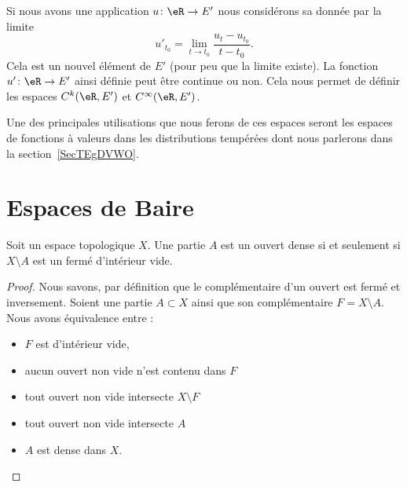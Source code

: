 \begin{definition}  \label{DefDZsypWu}
	Si nous avons une application \( u\colon \eR\to E'\) nous considérons sa  donnée par la limite
	\begin{equation}
		u'_{t_0}=\lim_{t\to t_0} \frac{ u_t-u_{t_0} }{ t-t_0 }.
	\end{equation}
	Cela est un nouvel élément de \( E'\) (pour peu que la limite existe). La fonction \( u'\colon \eR\to E'\) ainsi définie peut être continue ou non. Cela nous permet de définir les espaces \( C^k(\eR,E')\) et \( C^{\infty}(\eR,E')\).
\end{definition}
Une des principales utilisations que nous ferons de ces espaces seront les espaces de fonctions à valeurs dans les distributions tempérées dont nous parlerons dans la section~\ref{SecTEgDVWO}.

\section{Espaces de Baire}

\begin{lemma}	\label{LEMooRTXFooCMCaHC}
	Soit un espace topologique \( X\). Une partie \( A\) est un ouvert dense si et seulement si \( X\setminus A\) est un fermé d'intérieur vide.
\end{lemma}

\begin{proof}
	Nous savons, par définition que le complémentaire d'un ouvert est fermé et inversement. Soient une partie \( A\subset X\) ainsi que son complémentaire \( F=X\setminus A\). Nous avons équivalence entre :
	\begin{itemize}
		\item
		      \( F\) est d'intérieur vide,
		\item
		      aucun ouvert non vide n'est contenu dans \( F\)
		\item
		      tout ouvert non vide intersecte \( X\setminus F\)
		\item
		      tout ouvert non vide intersecte \( A\)
		\item
		      \( A\) est dense dans \( X\).
	\end{itemize}
\end{proof}

